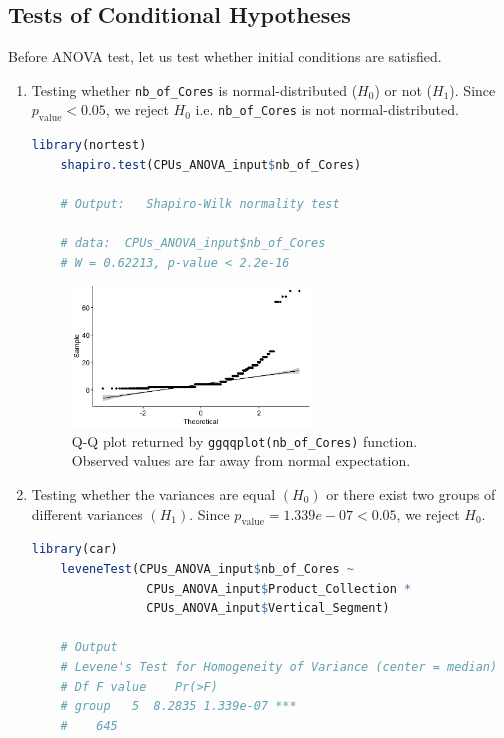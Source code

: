 \subsection{Tests of Conditional Hypotheses}
Before ANOVA test, let us test whether initial conditions are satisfied.
\begin{enumerate}
  \item Testing whether \texttt{nb\_of\_Cores} is normal-distributed ($H_0$) or not ($H_1$). Since $p_{\mathrm{value}}< 0.05$, we reject $H_0$ i.e. \texttt{nb\_of\_Cores} is not normal-distributed.
        \begin{lstlisting}[language=R]
    library(nortest)
    shapiro.test(CPUs_ANOVA_input$nb_of_Cores)

    # Output: 	Shapiro-Wilk normality test

    # data:  CPUs_ANOVA_input$nb_of_Cores
    # W = 0.62213, p-value < 2.2e-16
  \end{lstlisting}

        \begin{figure}[ht]
          \centering
          \includegraphics[width=0.6\textwidth]{img/5.png}
          \vspace{0.5cm}
          \caption{Q-Q plot returned by \texttt{ggqqplot(nb\_of\_Cores)} function. Observed values are far away from normal expectation.}
        \end{figure}

  \item Testing whether the variances are equal $(H_0)$ or there exist two groups of different variances $(H_1)$. Since $p_{\mathrm{value}} = 1.339e-07 < 0.05$, we reject $H_0$.
        \begin{lstlisting}[language=R]
    library(car)
    leveneTest(CPUs_ANOVA_input$nb_of_Cores ~ 
                CPUs_ANOVA_input$Product_Collection * 
                CPUs_ANOVA_input$Vertical_Segment)

    # Output
    # Levene's Test for Homogeneity of Variance (center = median)
    # Df F value    Pr(>F)    
    # group   5  8.2835 1.339e-07 ***
    #    645    
  \end{lstlisting}
\end{enumerate}

